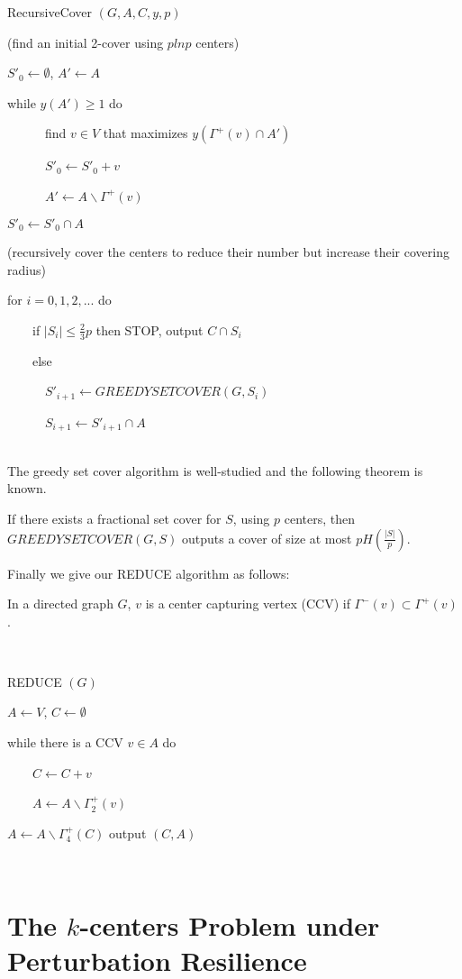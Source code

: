 \begin{algorithm}
\caption{RecursiveCover $(G,A,C,y,p)$}
(find an initial 2-cover using $plnp$ centers)

$S'_0 \leftarrow \emptyset$, $A' \leftarrow A$

while $y(A') \geq 1$ do

\ \ \ \ \ \ find $v \in V$ that maximizes $y(\Gamma^+(v)\cap A')$

\ \ \ \ \ \ $S'_0 \leftarrow S'_0+v$

\ \ \ \ \ \ $A'\leftarrow A \backslash \Gamma^+(v) $ 

$S'_0 \leftarrow S'_0 \cap A$ 

(recursively cover the centers to reduce their number but increase their covering radius)

for $i= 0,1,2,...$ do 

\ \ \ \ if $\vert S_i \vert \leq \frac{2}{3}p$ then STOP, output $C \cap S_i$

\ \ \ \ else

\ \ \ \ \ \ $S'_{i+1} \leftarrow GREEDYSETCOVER(G, S_i)$

\ \ \ \ \ \ $S_{i+1}\leftarrow S'_{i+1} \cap A$
\end{algorithm}\\
The greedy set cover algorithm is well-studied and the following theorem is known.
\begin{theorem}
If there exists a fractional set cover for $S$, using $p$ centers, then $GREEDYSETCOVER(G,S)$ outputs a cover of size at most $pH(\frac{\vert S \vert}{p})$. 
\end{theorem}
Finally we give our REDUCE algorithm as follows:\\
\begin{definition}
In a directed graph $G$, $v$ is a center capturing vertex (CCV) if $\Gamma^-(v) \subset \Gamma^+(v)$.
\end{definition}\\
\begin{algorithm}
\caption{REDUCE $(G)$}
$A \leftarrow V$, $C \leftarrow \emptyset$

while there is a CCV $v \in A$ do

\ \ \ \ $C \leftarrow C + v$

\ \ \ \ $A \leftarrow A \backslash \Gamma^+_2(v)$

$A \leftarrow A \backslash \Gamma^+_4(C)$
output $(C,A)$
\end{algorithm}\\
\section{The $k$-centers Problem under Perturbation Resilience}


